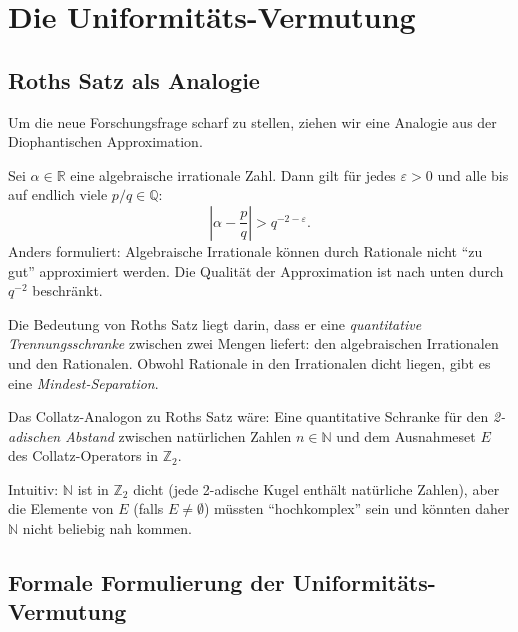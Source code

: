 \documentclass[12pt,a4paper]{article}
\newcommand{\N}{\mathbb{N}}
\newcommand{\R}{\mathbb{R}}
\newcommand{\Q}{\mathbb{Q}}
\newcommand{\Ztwo}{\mathbb{Z}_2}
\begin{document}
\section{Die Uniformitäts-Vermutung}
\label{sec:uniformitaet}

\subsection{Roths Satz als Analogie}

Um die neue Forschungsfrage scharf zu stellen, ziehen wir eine Analogie
aus der Diophantischen Approximation.

\begin{tcolorbox}[dioph, title={Roths Satz (1955)}]
Sei $\alpha \in \R$ eine algebraische irrationale Zahl. Dann gilt für jedes
$\varepsilon > 0$ und alle bis auf endlich viele $p/q \in \Q$:
\[
  \left|\alpha - \frac{p}{q}\right| > q^{-2-\varepsilon}.
\]
Anders formuliert: Algebraische Irrationale können durch Rationale nicht
``zu gut'' approximiert werden. Die Qualität der Approximation ist nach
unten durch $q^{-2}$ beschränkt.
\end{tcolorbox}

Die Bedeutung von Roths Satz liegt darin, dass er eine \emph{quantitative
Trennungsschranke} zwischen zwei Mengen liefert: den algebraischen
Irrationalen und den Rationalen. Obwohl Rationale in den Irrationalen
dicht liegen, gibt es eine \emph{Mindest-Separation}.

\begin{tcolorbox}[kernidee, title={Die Collatz-Analogie: Trennungsschranke zwischen $\N$ und $E$}]
Das Collatz-Analogon zu Roths Satz wäre: Eine quantitative Schranke für den
\emph{2-adischen Abstand} zwischen natürlichen Zahlen $n \in \N$ und dem
Ausnahmeset $E$ des Collatz-Operators in $\Ztwo$.

\medskip
Intuitiv: $\N$ ist in $\Ztwo$ dicht (jede 2-adische Kugel enthält natürliche
Zahlen), aber die Elemente von $E$ (falls $E \neq \emptyset$) müssten
``hochkomplex'' sein und könnten daher $\N$ nicht beliebig nah kommen.
\end{tcolorbox}

\subsection{Formale Formulierung der Uniformitäts-Vermutung}
\end{document}
